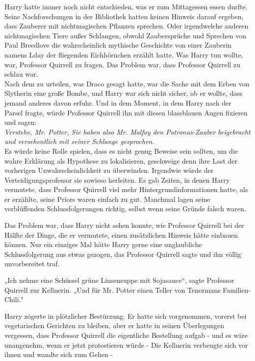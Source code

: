 {Harry hatte immer noch nicht entschieden, was er zum Mittagessen essen durfte. Seine Nachforschungen in der Bibliothek hatten keinen Hinweis darauf ergeben, dass Zauberer mit nichtmagischen Pflanzen sprechen. Oder irgendwelche anderen nichtmagischen Tiere außer Schlangen, obwohl Zaubersprüche und Sprechen von Paul Breedlove die wahrscheinlich mythische Geschichte von einer Zauberin namens Lday der fliegenden Eichhörnchen erzählt hatte. Was Harry tun wollte, war, Professor Quirrell zu fragen. Das Problem war, dass Professor Quirrell zu schlau war.\\ Nach dem zu urteilen, was Draco gesagt hatte, war die Sache mit dem Erben von Slytherin eine große Bombe, und Harry war sich nicht sicher, ob er wollte, dass jemand anderes davon erfuhr. Und in dem Moment, in dem Harry nach der Parsel fragte, würde Professor Quirrell ihn mit diesen blassblauen Augen fixieren und sagen:\\ \emph{Verstehe, Mr. Potter, Sie haben also Mr. Malfoy den Patronus-Zauber beigebracht und versehentlich mit seiner Schlange gesprochen.}\\ Es würde keine Rolle spielen, dass es nicht genug Beweise sein sollten, um die wahre Erklärung als Hypothese zu lokalisieren, geschweige denn ihre Last der vorherigen Unwahrscheinlichkeit zu überwinden. Irgendwie würde der Verteidigungsprofessor sie sowieso herleiten. Es gab Zeiten, in denen Harry vermutete, dass Professor Quirrell viel mehr Hintergrundinformationen hatte, als er erzählte, seine Priors waren einfach zu gut. Manchmal lagen seine verblüffenden Schlussfolgerungen richtig, selbst wenn seine Gründe falsch waren.

Das Problem war, dass Harry nicht sehen konnte, wie Professor Quirrell bei der Hälfte der Dinge, die er vermutete, einen zusätzlichen Hinweis hätte einbauen können. Nur ein einziges Mal hätte Harry gerne eine unglaubliche Schlussfolgerung aus etwas gezogen, das Professor Quirrell sagte und ihn völlig unvorbereitet traf.

„Ich nehme eine Schüssel grüne Linsensuppe mit Sojasauce“, sagte Professor Quirrell zur Kellnerin. „Und für Mr. Potter einen Teller von Tenormans Familien-Chili."

Harry zögerte in plötzlicher Bestürzung. Er hatte sich vorgenommen, vorerst bei vegetarischen Gerichten zu bleiben, aber er hatte in seinen Überlegungen vergessen, dass Professor Quirrell die eigentliche Bestellung aufgab - und es wäre unangenehm, wenn er jetzt protestieren würde - Die Kellnerin verbeugte sich vor ihnen und wandte sich zum Gehen -

}
